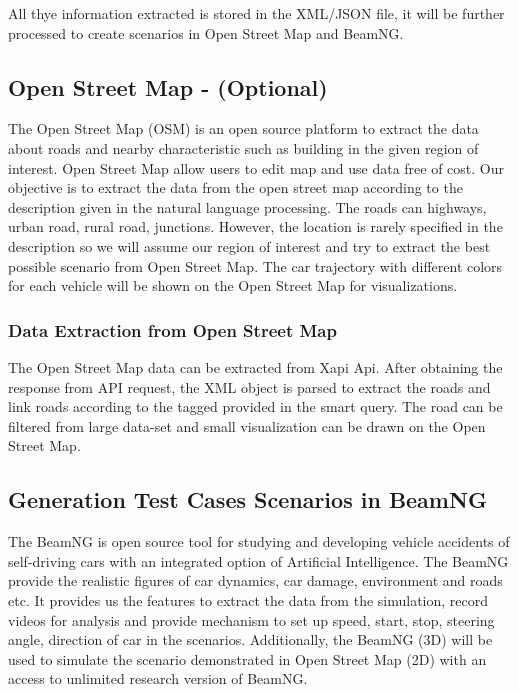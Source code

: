 All thye information extracted is stored in the XML/JSON file, it will be further processed to create scenarios in Open Street Map and BeamNG. 


\subsection{Open Street Map - (Optional)}
The Open Street Map (OSM) is an open source platform to extract the data about roads and nearby characteristic such as building in the given region of interest. Open Street Map allow users to edit map and use data free of cost. Our objective is to extract the data from the open street map according to the description given in the natural language processing. The roads can highways, urban road, rural road, junctions. However, the location is rarely specified in the description so we will assume our region of interest and try to extract the best possible scenario from Open Street Map. The car trajectory with different colors for each vehicle will be shown on the Open Street Map for visualizations. 

\subsubsection{Data Extraction from Open Street Map}
The Open Street Map\cite{haklay2008openstreetmap} data can be extracted from Xapi Api. After obtaining the response from API request, the XML object is parsed to extract the roads and link roads according to the tagged provided in the smart query. The road can be filtered from large data-set and small visualization can be drawn on the Open Street Map. 

\subsection{Generation Test Cases Scenarios in BeamNG}
The BeamNG is open source tool for studying and developing vehicle accidents of self-driving cars with an integrated option of Artificial Intelligence. The BeamNG provide the realistic figures of car dynamics, car damage, environment and roads etc. It provides us the features to extract the data from the simulation, record videos for analysis and provide mechanism to set up speed, start, stop, steering angle, direction of car in the scenarios. Additionally, the BeamNG (3D) will be used to simulate the scenario demonstrated in Open Street Map (2D) with an access to unlimited research version of BeamNG.  
 

